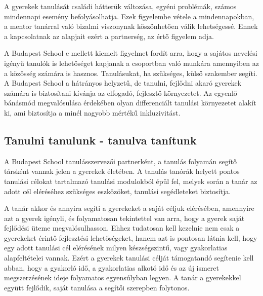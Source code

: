 A gyerekek tanulását családi hátterük változása, egyéni problémák, számos
mindennapi esemény befolyásolhatja. Ezek figyelembe vétele a mindennapokban, a
mentor tanárral való bizalmi viszonynak köszönhetően válik lehetségessé. Ennek
a kapcsolatnak az alapjait ezért a partnerség, az értő figyelem adja.

A Budapest School e mellett kiemelt figyelmet fordít arra, hogy a sajátos
nevelési igényű tanulók is lehetőséget kapjanak a csoportban való munkára
amennyiben az a közösség számára is hasznos. Tanulásukat, ha szükséges, külső
szakember segíti. A Budapest School a hátrányos helyzetű, de tanulni, fejlődni
akaró gyerekek számára is biztosítani kívánja az elfogadó, fejlesztő
környezetet. Az egyenlő bánásmód megvalósulása érdekében olyan differenciált
tanulási környezetet alakít ki, ami biztosítja a minél nagyobb mértékű
inkluzivitást.

\subsection{Tanulni tanulunk - tanulva tanítunk}
A Budapest School tanulásszervezői partnerként, a tanulás folyamán segítő
társként vannak jelen a gyerekek életében. A tanulás tanórák helyett pontos
tanulási célokat tartalmazó tanulási modulokból épül fel, melyek során a tanár
az adott cél eléréséhez szükséges eszközöket, tanulási segédleteket biztosítja.

A tanár akkor és annyira segíti a gyerekeket a saját céljuk elérésében,
amennyire azt a gyerek igényli, és folyamatosan tekintettel van arra, hogy a
gyerek saját fejlődési üteme megvalósulhasson. Ehhez tudatosan kell kezelnie
nem csak a gyerekeket érintő fejlesztési lehetőségeket, hanem azt is pontosan
látnia kell, hogy egy adott tanulási cél elérésének milyen készségszintű, vagy
gyakorlatias alapfeltételei vannak. Ezért a gyerekek tanulási célját
támogatandó segítenie kell abban, hogy a gyakorló idő, a gyakorlatias alkotó
idő és az új ismeret megszerzésének ideje folyamatos egyensúlyban legyen. A
tanár a gyerekekkel együtt fejlődik, saját tanulása a segítői szerepben
folytonos.
